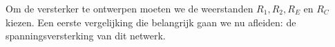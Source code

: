 \documentclass{article}
\begin{document}

				Om de versterker te ontwerpen moeten we de weerstanden $R_1,R_2,R_E$ en $R_C$ kiezen. Een eerste vergelijking die belangrijk gaan we nu afleiden: de spanningsversterking van dit netwerk.
\end{document}
